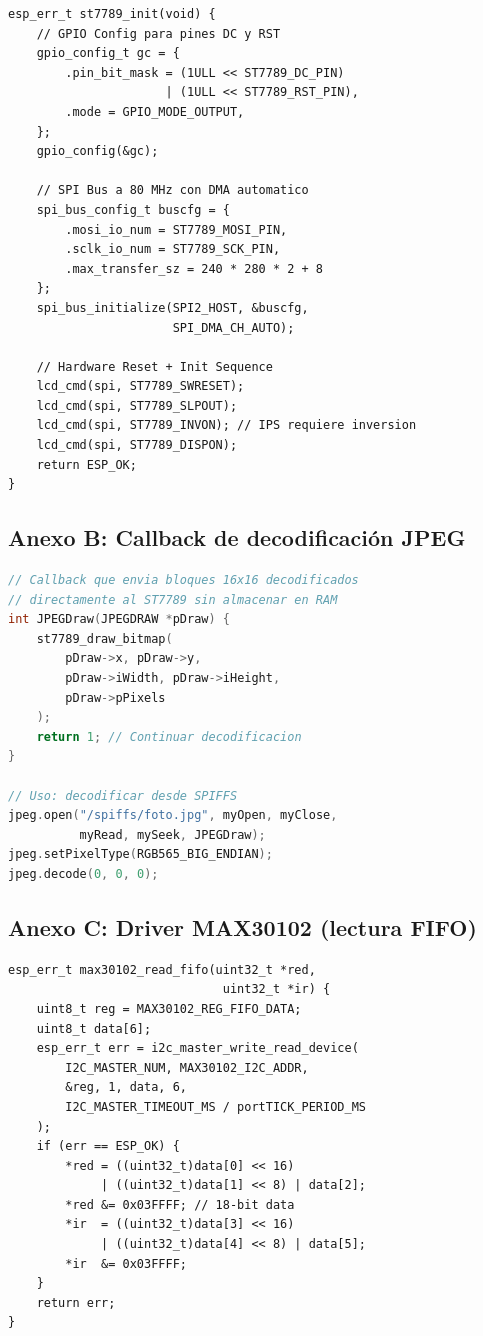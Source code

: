 \documentclass[letterpaper,11pt]{article}
\begin{document}
\begin{lstlisting}[caption={Función de inicialización del driver ST7789.}, label={lst:st7789_init}]
esp_err_t st7789_init(void) {
    // GPIO Config para pines DC y RST
    gpio_config_t gc = {
        .pin_bit_mask = (1ULL << ST7789_DC_PIN)
                      | (1ULL << ST7789_RST_PIN),
        .mode = GPIO_MODE_OUTPUT,
    };
    gpio_config(&gc);

    // SPI Bus a 80 MHz con DMA automatico
    spi_bus_config_t buscfg = {
        .mosi_io_num = ST7789_MOSI_PIN,
        .sclk_io_num = ST7789_SCK_PIN,
        .max_transfer_sz = 240 * 280 * 2 + 8
    };
    spi_bus_initialize(SPI2_HOST, &buscfg,
                       SPI_DMA_CH_AUTO);

    // Hardware Reset + Init Sequence
    lcd_cmd(spi, ST7789_SWRESET);
    lcd_cmd(spi, ST7789_SLPOUT);
    lcd_cmd(spi, ST7789_INVON); // IPS requiere inversion
    lcd_cmd(spi, ST7789_DISPON);
    return ESP_OK;
}
\end{lstlisting}

\subsection{Anexo B: Callback de decodificación JPEG}

\begin{lstlisting}[caption={Callback de renderizado JPEG por bloques MCU.}, label={lst:jpegdraw}, language=C++]
// Callback que envia bloques 16x16 decodificados
// directamente al ST7789 sin almacenar en RAM
int JPEGDraw(JPEGDRAW *pDraw) {
    st7789_draw_bitmap(
        pDraw->x, pDraw->y,
        pDraw->iWidth, pDraw->iHeight,
        pDraw->pPixels
    );
    return 1; // Continuar decodificacion
}

// Uso: decodificar desde SPIFFS
jpeg.open("/spiffs/foto.jpg", myOpen, myClose,
          myRead, mySeek, JPEGDraw);
jpeg.setPixelType(RGB565_BIG_ENDIAN);
jpeg.decode(0, 0, 0);
\end{lstlisting}

\subsection{Anexo C: Driver MAX30102 (lectura FIFO)}

\begin{lstlisting}[caption={Lectura de muestras desde la FIFO del MAX30102.}, label={lst:max30102}]
esp_err_t max30102_read_fifo(uint32_t *red,
                              uint32_t *ir) {
    uint8_t reg = MAX30102_REG_FIFO_DATA;
    uint8_t data[6];
    esp_err_t err = i2c_master_write_read_device(
        I2C_MASTER_NUM, MAX30102_I2C_ADDR,
        &reg, 1, data, 6,
        I2C_MASTER_TIMEOUT_MS / portTICK_PERIOD_MS
    );
    if (err == ESP_OK) {
        *red = ((uint32_t)data[0] << 16)
             | ((uint32_t)data[1] << 8) | data[2];
        *red &= 0x03FFFF; // 18-bit data
        *ir  = ((uint32_t)data[3] << 16)
             | ((uint32_t)data[4] << 8) | data[5];
        *ir  &= 0x03FFFF;
    }
    return err;
}
\end{lstlisting}
\end{document}
